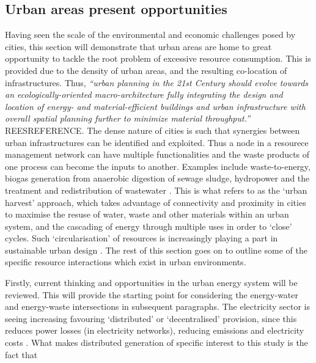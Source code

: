 \subsection{Urban areas present opportunities}
Having seen the scale of the environmental and economic challenges posed by cities, this section will demonstrate that urban areas are home to great opportunity to tackle the root problem of excessive resource consumption. This is provided due to the density of urban areas, and the resulting co-location of infrastructures. Thus, \emph{``urban planning in the 21st Century should evolve towards an ecologically-oriented macro-architecture fully integrating the design and location of energy- and material-efficient buildings and urban infrastructure with overall spatial planning further to minimize material throughput.''} REESREFERENCE. The dense nature of cities is such that synergies between urban infrastructures can be identified and exploited. Thus a node in a resourece management network can have multiple functionalities and the waste products of one process can become the inputs to another. Examples include waste-to-energy, biogas generation from anaerobic digestion of sewage sludge, hydropower and the treatment and redistribution of wastewater \citep{Kharrazi2012}. This is what \citet{Leduc2010} refers to as the `urban harvest' approach, which takes advantage of connectivity and proximity in cities to maximise the resuse of water, waste and other materials within an urban system, and the cascading of energy through multiple uses in order to `close' cycles. Such `circularisation' of resources is increasingly playing a part in sustainable urban design \citep{Meijer2011}. The rest of this section goes on to outline some of the specific resource interactions which exist in urban environments.


Firstly, current thinking and opportunities in the urban energy system will be  reviewed. This will provide the starting point for considering the energy-water and energy-waste intersections in subsequent paragraphs. The electricity sector is seeing increasing favouring `distributed' or `decentralised' provision, since this reduces power losses (in electricity networks), reducing emissions and electricity costs \citep{Fleten2007}. What makes distributed generation of specific interest to this study is the fact that 
 
